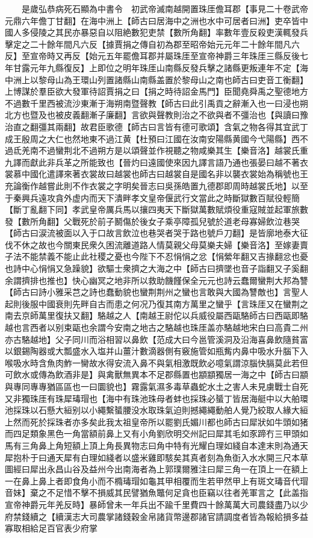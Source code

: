 　　是歲弘恭病死石顯為中書令　初武帝滅南越開置珠厓儋耳郡【事見二十卷武帝元鼎六年儋丁甘翻】在海中洲上【師古曰居海中之洲也水中可居者曰洲】吏卒皆中國人多侵陵之其民亦暴惡自以阻絶數犯吏禁【數所角翻】率數年壹反殺吏漢輒發兵擊定之二十餘年間凡六反【據賈捐之傳自初為郡至昭帝始元元年二十餘年間凡六反】至宣帝時又再反【始元五年罷儋耳郡并屬珠厓至宣帝神爵三年珠厓三縣反後七年甘露元年九縣復反】上即位之明年珠厓山南縣反發兵擊之諸縣更叛連年不定【海中洲上以黎母山為王環山列置諸縣山南縣盖置於黎母山之南也師古曰吏音工衡翻】上博謀於羣臣欲大發軍待詔賈捐之曰【捐之時待詔金馬門】臣聞堯舜禹之聖德地方不過數千里西被流沙東漸于海朔南暨聲教【師古曰此引禹貢之辭漸入也一曰浸也朔北方也暨及也被皮義翻漸子廉翻】言欲與聲教則治之不欲與者不彊治也【與讀曰豫治直之翻彊其兩翻】故君臣歌德【師古曰言皆有德可歌頌】含氣之物各得其宜武丁成王殷周之大仁也然地東不過江黄【杜預曰江國在汝南安陽縣黄國今弋陽縣】西不過氐羌南不過蠻荆北不過朔方是以頌聲並作視聽之物咸樂其生【樂音洛】越裳氏重九譯而獻此非兵革之所能致也【晉灼曰遠國使來因九譯言語乃通也張晏曰越不著衣裳慕中國化遣譯來著衣裳故曰越裳也師古曰越裳自是國名非以襲衣裳始為稱號也王充論衡作越嘗此則不作衣裳之字明矣晉志曰吳孫皓置九德郡即周時越裳氏地】以至于秦興兵遠攻貪外虚内而天下潰畔孝文皇帝偃武行文當此之時斷獄數百賦役輕簡【斷丁亂翻下同】孝武皇帝厲兵馬以攘四夷天下斷獄萬數賦煩役重寇賊並起軍旅數發【數所角翻】父戰死於前子鬭傷於後女子乘亭障孤兒號於道老母寡婦飲泣巷哭【師古曰涙流被面以入于口故言飲泣也巷哭者哭于路也號戶刀翻】是皆廓地泰大征伐不休之故也今關東民衆久困流離道路人情莫親父母莫樂夫婦【樂音洛】至嫁妻賣子法不能禁義不能止此社稷之憂也今陛下不忍悁悁之忿【悁縈年翻又吉掾翻忿也憂也詩中心悁悁又急躁貌】欲驅士衆擠之大海之中【師古曰擠墜也音子詣翻又子奚翻余謂擠排也推也】快心幽冥之地非所以救助饑饉保全元元也詩云蠢爾蠻荆大邦為讐【師古曰詩小雅采芑之詩也蠢動貌也蠻荆荆州之蠻也言敢與大國為讐敵也】言聖人起則後服中國衰則先畔自古而患之何况乃復其南方萬里之蠻乎【言珠厓又在蠻荆之南去京師萬里復扶又翻】駱越之人【南越王尉佗以兵威役屬西甌駱師古曰西甌即駱越也言西者以别束甌也余謂今安南之地古之駱越也珠厓盖亦駱越地宋白曰高貴二州亦古駱越地】父子同川而浴相習以鼻飲【范成大曰今邕管溪洞及沿海喜鼻飲隨貧富以銀錫陶器或大瓢盛水入塩并山薑汁數滴器側有竅施管如瓶觜内鼻中吸水升腦下入喉吸水時含魚肉鮓一臠故水得安流入鼻不與氣相激既飲必噫氣謂涼腦快膈莫此若但可飲水或傳為飲酒非是】與禽獸無異本不足郡縣置也顓顓獨居一海之中【師古曰顓與專同專專猶區區也一曰圜貌也】霧露氣濕多毒草蟲蛇水土之害人未見虜戰士自死又非獨珠厓有珠犀瑇瑁也【海中有珠池珠母者蚌也採珠必蜑丁皆居海艇中以大舶環池採珠以石懸大絙别以小繩繫蜑腰没水取珠氣迫則撼繩繩動舶人覺乃絞取人緣大絙上然而死於採珠者亦多矣此我太祖皇帝所以罷劉氏媚川都也師古曰犀狀如牛頭如猪而四足類象黑色一角當額前鼻上又有小角劉欣明交州記曰犀其毛如豕蹄冇三甲頭如馬有三角鼻上角短額上頂上角長異物志曰角中特有光耀白理如綫自本達末則為通天犀抱朴于曰通天犀有白理如綫者以盛米雞即駭矣其真者刻為魚衘入水水開三尺本草圖經曰犀出永昌山谷及益州今出南海者為上郭璞爾雅注曰犀三角一在頂上一在額上一在鼻上鼻上者即食角小而不橢瑇瑁如龜其甲相覆而生若甲然甲上有斑文瑇音代瑁音妹】棄之不足惜不擊不損威其民譬猶魚鼈何足貪也臣竊以往者羌軍言之【此盖指宣帝神爵元年羌反時】暴師曾未一年兵出不踰千里費四十餘萬萬大司農錢盡乃以少府禁錢續之【續漢志大司農掌諸錢穀金帛諸貨幣邊郡諸官請調度者皆為報給損多益寡取相給足百官表少府掌